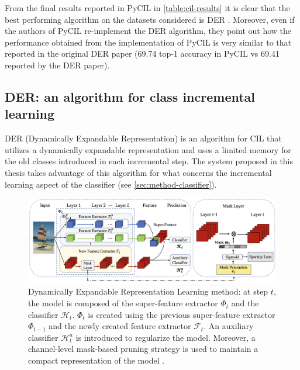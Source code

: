 From the final results reported in PyCIL in \autoref{table:cil-results} it is clear that the best performing algorithm on the datasets considered is DER \cite{yan2021dynamically}. Moreover, even if the authors of PyCIL re-implement the DER algorithm, they point out how the performance obtained from the implementation of PyCIL is very similar to that reported in the original DER paper (69.74 top-1 accuracy in PyCIL vs 69.41 reported by the DER paper).


\subsection{DER: an algorithm for class incremental learning}
\label{sec:der-algorithm}
DER (Dynamically Expandable Representation) is an algorithm for CIL that utilizes a dynamically expandable representation and uses a limited memory for the old classes introduced in each incremental step. The system proposed in this thesis takes advantage of this algorithm for what concerns the incremental learning aspect of the classifier (see \autoref{sec:method-classifier}).


\begin{figure}%
	\centering

    \begin{center}
        \includegraphics[width=\columnwidth]{images/der-pipeline.png}
    \end{center}

	\caption{Dynamically Expandable Representation Learning method: at step $t$, the model is composed of the super-feature extractor $\Phi_t$ and the classifier $\mathcal{H}_t$. $\Phi_t$ is created using the previous super-feature extractor $\Phi_{t-1}$ and the newly created feature extractor $\mathcal{F}_t$. An auxiliary classifier $\mathcal{H}_t^a$ is introduced to regularize the model. Moreover, a channel-level
    mask-based pruning strategy is used to maintain a compact representation of the model \cite{yan2021dynamically}.}%
	\label{fig:der-pipeline}%
\end{figure}


